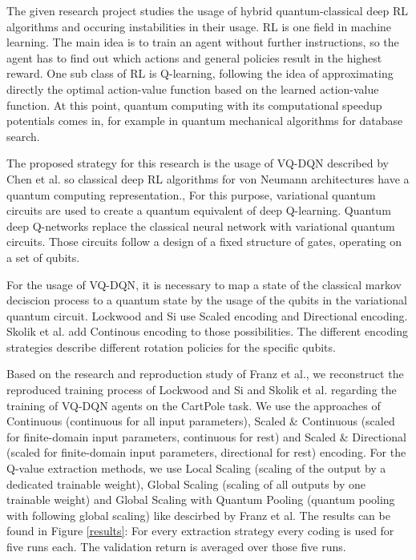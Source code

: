 The given research project studies the usage of hybrid quantum-classical deep \ac{RL} algorithms and occuring instabilities in their usage.
\ac{RL} is one field in machine learning.
The main idea is to train an agent without further instructions, so the agent has to find out which actions and general policies result in the highest reward.
One sub class of \ac{RL} is Q-learning, following the idea of approximating directly the optimal action-value function based on the learned action-value function.\autocite{rl}
At this point, quantum computing with its computational speedup potentials comes in, for example in quantum mechanical algorithms for database search\autocite{databasesearch}. 



The proposed strategy for this research is the usage of \ac{VQ-DQN} described by Chen et al. so classical deep \ac{RL} algorithms for von Neumann architectures have a quantum computing representation.\autocite{vqdqn},
For this purpose, variational quantum circuits are used to create a quantum equivalent of deep Q-learning.
Quantum deep Q-networks replace the classical neural network with variational quantum circuits.
Those circuits follow a design of a fixed structure of gates, operating on a set of qubits.\autocite{circuits}


For the usage of \ac{VQ-DQN}, it is necessary to map a state of the classical markov deciscion process to a quantum state by the usage of the qubits in the variational quantum circuit. 
Lockwood and Si use Scaled encoding and Directional encoding.\autocite{lockwood}
Skolik et al. add Continous encoding to those possibilities.\autocite{skolik} 
The different encoding strategies describe different rotation policies for the specific qubits.


Based on the research and reproduction study of Franz et al.\autocite{instabilities}, we reconstruct the reproduced training process of Lockwood and Si\autocite{lockwood} and Skolik et al.\autocite{skolik} regarding the training of \ac{VQ-DQN} agents on the CartPole task. 
We use the approaches of Continuous (continuous for all input parameters), Scaled \& Continuous (scaled for finite-domain input parameters, continuous for rest) and Scaled \& Directional (scaled for finite-domain input parameters, directional for rest) encoding. 
For the Q-value extraction methods, we use Local Scaling (scaling of the output by a dedicated trainable weight), Global Scaling (scaling of all outputs by one trainable weight) and Global Scaling with Quantum Pooling (quantum pooling with following global scaling) like descirbed by Franz et al.\autocite{instabilities}
The results can be found in Figure \ref{results}: For every extraction strategy every coding is used for five runs each.
The validation return is averaged over those five runs.

